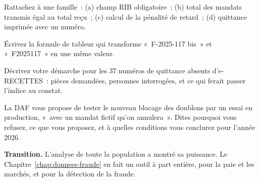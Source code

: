 \begin{boxexo}[title={\ding{45}\quad Exercice~11.1. Classer \niveaubase}]
Rattachez à une famille~: (a) champ RIB obligatoire~; (b) total des
mandats transmis égal au total reçu~; (c) calcul de la pénalité de
retard~; (d) quittance imprimée avec un numéro.
\end{boxexo}

\begin{boxexo}[title={\ding{45}\quad Exercice~11.2. Normaliser \niveaubase}]
Écrivez la formule de tableur qui transforme «~F-2025-117 bis~» et
«~F2025117~» en une même valeur.
\end{boxexo}

\begin{boxexo}[title={\ding{45}\quad Exercice~11.3. Les 37 numéros \niveaumoyen}]
Décrivez votre démarche pour les 37 numéros de quittance absents
d'e-RECETTES~: pièces demandées, personnes interrogées, et ce qui ferait
passer l'indice au constat.
\end{boxexo}

\begin{boxexo}[title={\ding{45}\quad Exercice~11.4. Essai ou population \niveauexpert}]
La DAF vous propose de tester le nouveau blocage des doublons par un essai
en production, «~avec un mandat fictif qu'on annulera~». Dites pourquoi
vous refusez, ce que vous proposez, et à quelles conditions vous
conclurez \OUI{} pour l'année 2026.
\end{boxexo}

\begin{boxinfo}
\textbf{Transition.} L'analyse de toute la population a montré sa
puissance. Le Chapitre~\ref{chap:donnees-fraude} en fait un outil à part
entière, pour la paie et les marchés, et pour la détection de la fraude.
\end{boxinfo}
